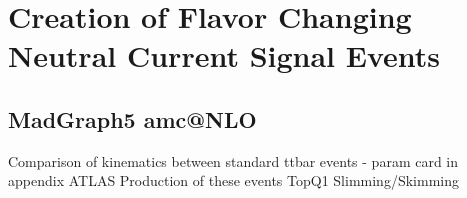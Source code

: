\section{Creation of Flavor Changing Neutral Current Signal Events}
\label{Sec:MG5Sig}
\subsection{MadGraph5 amc@NLO}
Comparison of kinematics between standard ttbar events
- param card in appendix
ATLAS Production of these events
TopQ1 Slimming/Skimming








%
%
%
%
%
